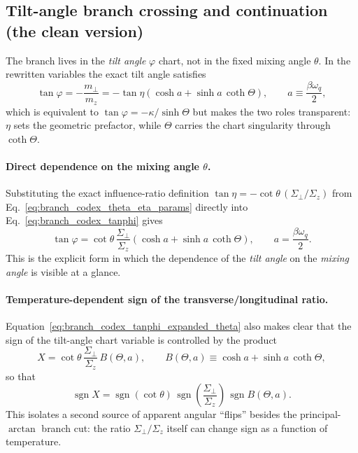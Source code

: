 \subsection{Tilt-angle branch crossing and continuation (the clean version)}

The branch lives in the \emph{tilt angle} $\varphi$ chart, not in the fixed
mixing angle $\theta$.  In the rewritten variables the exact tilt angle
satisfies
\begin{equation}
    \tan\varphi
    = -\frac{m_\perp}{m_z}
    = -\tan\eta\left(\cosh a + \sinh a\,\coth\Theta\right),
    \qquad a\equiv \frac{\beta\omega_q}{2},
    \label{eq:branch_codex_tanphi}
\end{equation}
which is equivalent to $\tan\varphi=-\kappa/\sinh\Theta$ but makes the two
roles transparent: $\eta$ sets the geometric prefactor, while $\Theta$ carries
the chart singularity through $\coth\Theta$.

\paragraph{Direct dependence on the mixing angle \texorpdfstring{$\theta$}{theta}.}
Substituting the exact influence-ratio definition
$\tan\eta=-\cot\theta\,(\Sigma_\perp/\Sigma_z)$ from
Eq.~\eqref{eq:branch_codex_theta_eta_params} directly into
Eq.~\eqref{eq:branch_codex_tanphi} gives
\begin{equation}
    \tan\varphi
    =
    \cot\theta\,\frac{\Sigma_\perp}{\Sigma_z}
    \left(\cosh a + \sinh a\,\coth\Theta\right),
    \qquad a=\frac{\beta\omega_q}{2}.
    \label{eq:branch_codex_tanphi_expanded_theta}
\end{equation}
This is the explicit form in which the dependence of the \emph{tilt angle}
on the \emph{mixing angle} is visible at a glance.

\paragraph{Temperature-dependent sign of the transverse/longitudinal ratio.}
Equation~\eqref{eq:branch_codex_tanphi_expanded_theta} also makes clear that
the sign of the tilt-angle chart variable is controlled by the product
\begin{equation}
    X
    =
    \cot\theta\,
    \frac{\Sigma_\perp}{\Sigma_z}\,
    B(\Theta,a),
    \qquad
    B(\Theta,a)\equiv \cosh a + \sinh a\,\coth\Theta,
    \label{eq:branch_codex_X_sign_factorized}
\end{equation}
so that
\begin{equation}
    \operatorname{sgn}X
    = \operatorname{sgn}(\cot\theta)\,
      \operatorname{sgn}\!\left(\frac{\Sigma_\perp}{\Sigma_z}\right)\,
      \operatorname{sgn}B(\Theta,a).
    \label{eq:branch_codex_sgnX_factorized}
\end{equation}
This isolates a second source of apparent angular ``flips'' besides the
principal-$\arctan$ branch cut: the ratio $\Sigma_\perp/\Sigma_z$ itself can
change sign as a function of temperature.

